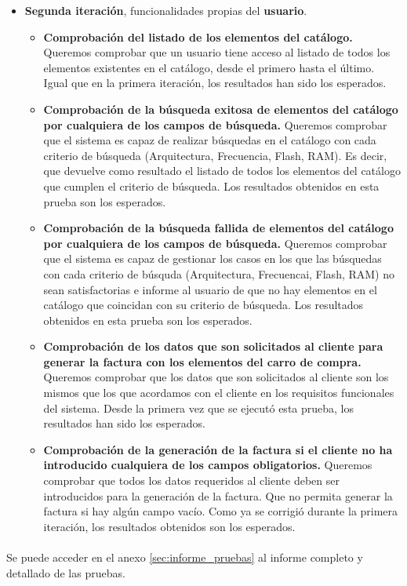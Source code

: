\begin{itemize}
\item \vspace{0.1in} \textbf{Segunda iteración}, funcionalidades propias del \textbf{usuario}.
	\begin{itemize}
	\item \textbf{Comprobación del listado de los elementos del catálogo.} Queremos comprobar que un usuario tiene acceso al listado de todos los elementos existentes en el catálogo, desde el primero hasta el último. Igual que en la primera iteración, los resultados han sido los esperados.
	
	\item \textbf{Comprobación de la búsqueda exitosa de elementos del catálogo por cualquiera de los campos de búsqueda.} Queremos comprobar que el sistema es capaz de realizar búsquedas en el catálogo con cada criterio de búsqueda (Arquitectura, Frecuencia, Flash, RAM). Es decir, que devuelve como resultado el listado de todos los elementos del catálogo que cumplen el criterio de búsqueda. Los resultados obtenidos en esta prueba son los esperados.
	
	\item \textbf{Comprobación de la búsqueda fallida de elementos del catálogo por cualquiera de los campos de búsqueda.} Queremos comprobar que el sistema es capaz de gestionar los casos en los que las búsquedas con cada criterio de búsquda (Arquitectura, Frecuencai, Flash, RAM) no sean satisfactorias e informe al usuario de que no hay elementos en el catálogo que coincidan con su criterio de búsqueda. Los resultados obtenidos en esta prueba son los esperados.

	\item \textbf{Comprobación de los datos que son solicitados al cliente para generar la factura con los elementos del carro de compra.} Queremos comprobar que los datos que son solicitados al cliente son los mismos que los que acordamos con el cliente en los requisitos funcionales del sistema. Desde la primera vez que se ejecutó esta prueba, los resultados han sido los esperados.
	
	\item \textbf{Comprobación de la generación de la factura si el cliente no ha introducido cualquiera de los campos obligatorios.} Queremos comprobar que todos los datos requeridos al cliente deben ser introducidos para la generación de la factura. Que no permita generar la factura si hay algún campo vacío. Como ya se corrigió durante la primera iteración, los resultados obtenidos son los esperados.
	\end{itemize}			
\end{itemize}
\paragraph{}Se puede acceder en el anexo \ref{sec:informe_pruebas} al informe completo y detallado de las pruebas.